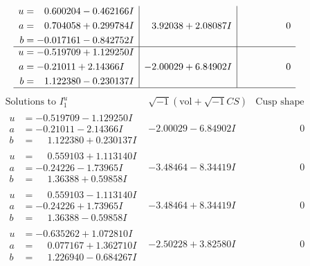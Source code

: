 \documentclass[1p]{elsarticle_modified}
\theoremstyle{definition}
\newcommand{\I}{\sqrt{-1}}
\begin{document}
$$\begin{array}{c|c|c}
\begin{aligned}
u &= \phantom{-}0.600204 - 0.462166 I \\
a &= \phantom{-}0.704058 + 0.299784 I \\
b &= -0.017161 - 0.842752 I\end{aligned}
 & \phantom{-}3.92038 + 2.08087 I & \phantom{-0.000000 } 0 \\ \hline\begin{aligned}
u &= -0.519709 + 1.129250 I \\
a &= -0.21011 + 2.14366 I \\
b &= \phantom{-}1.122380 - 0.230137 I\end{aligned}
 & -2.00029 + 6.84902 I & \phantom{-0.000000 } 0\\
 \hline 
 \end{array}$$\newpage$$\begin{array}{c|c|c}  
\text{Solutions to }I^u_{1}& \I (\text{vol} + \sqrt{-1}CS) & \text{Cusp shape}\\
 \hline 
\begin{aligned}
u &= -0.519709 - 1.129250 I \\
a &= -0.21011 - 2.14366 I \\
b &= \phantom{-}1.122380 + 0.230137 I\end{aligned}
 & -2.00029 - 6.84902 I & \phantom{-0.000000 } 0 \\ \hline\begin{aligned}
u &= \phantom{-}0.559103 + 1.113140 I \\
a &= -0.24226 - 1.73965 I \\
b &= \phantom{-}1.36388 + 0.59858 I\end{aligned}
 & -3.48464 - 8.34419 I & \phantom{-0.000000 } 0 \\ \hline\begin{aligned}
u &= \phantom{-}0.559103 - 1.113140 I \\
a &= -0.24226 + 1.73965 I \\
b &= \phantom{-}1.36388 - 0.59858 I\end{aligned}
 & -3.48464 + 8.34419 I & \phantom{-0.000000 } 0 \\ \hline\begin{aligned}
u &= -0.635262 + 1.072810 I \\
a &= \phantom{-}0.077167 + 1.362710 I \\
b &= \phantom{-}1.226940 - 0.684267 I\end{aligned}
 & -2.50228 + 3.82580 I & \phantom{-0.000000 } 0 \\ \hline\begin{aligned}

\end{aligned}
\end{array}$$
\end{document}
